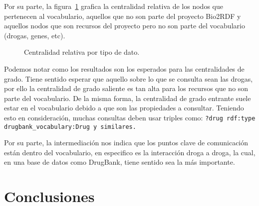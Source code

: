 Por su parte, la figura~\ref{fig:comptype} grafica la centralidad relativa de
los nodos que pertenecen al vocabulario, aquellos que no son parte del proyecto
Bio2RDF y aquellos nodos que son recursos del proyecto pero no son parte del
vocabulario (drogas, genes, etc).
\begin{figure}[h]
  \caption{Centralidad relativa por tipo de dato.}
  \label{fig:comptype}
\end{figure}

Podemos notar como los resultados son los esperados para las centralidades de
grado. Tiene sentido esperar que aquello sobre lo que se consulta sean las
drogas, por ello la centralidad de grado saliente es tan alta para los recursos
que no son parte del vocabulario. De la misma forma, la centralidad de grado
entrante suele estar en el vocabulario debido a que son las propiedades a
consultar. Teniendo esto en consideración, muchas consultas deben usar triples
como: \tt{?drug rdf:type drugbank\_vocabulary:Drug} y similares.

Por su parte, la intermediación nos indica que los puntos clave de comunicación
están dentro del vocabulario, en especifico es la interacción droga a droga, la
cual, en una base de datos como DrugBank, tiene sentido sea la más importante.

\section{Conclusiones}\label{sec:con}

